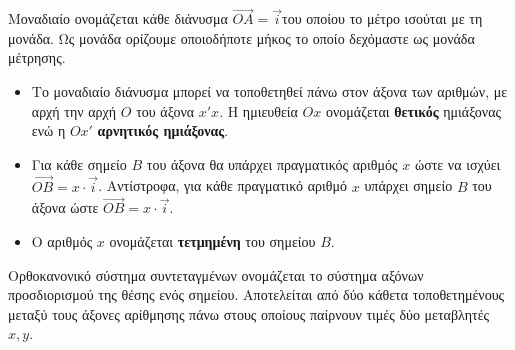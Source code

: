 \documentclass[twoside,nofonts,internet,shmeiwseis]{thewria}
\begin{document}
\orismoi
{}
Μοναδιαίο ονομάζεται κάθε διάνυσμα $ \overrightarrow{OA}=\vec{i} $του οποίου το μέτρο ισούται με τη μονάδα. Ως μονάδα ορίζουμε οποιοδήποτε μήκος το οποίο δεχόμαστε ως μονάδα μέτρησης.
\begin{center}
\end{center}
\begin{itemize}
\item Το μοναδιαίο διάνυσμα μπορεί να τοποθετηθεί πάνω στον άξονα των αριθμών, με αρχή την αρχή $ O $ του άξονα $ x'x $. Η ημιευθεία $ Ox $ ονομάζεται \textbf{θετικός} ημιάξονας ενώ η $ Ox' $ \textbf{αρνητικός ημιάξονας}.
\item Για κάθε σημείο $ B $ του άξονα θα υπάρχει πραγματικός αριθμός $ x $ ώστε να ισχύει $ \overrightarrow{OB}=x\cdot\vec{i} $. Αντίστροφα, για κάθε πραγματικό αριθμό $ x $ υπάρχει σημείο $ B $ του άξονα ώστε $ \overrightarrow{OB}=x\cdot\vec{i} $.
\item Ο αριθμός $ x $ ονομάζεται \textbf{τετμημένη} του σημείου $ B $.
\end{itemize}
Ορθοκανονικό σύστημα συντεταγμένων ονομάζεται το σύστημα αξόνων προσδιορισμού της θέσης ενός σημείου. Αποτελείται από δύο κάθετα τοποθετημένους μεταξύ τους άξονες αρίθμησης πάνω στους οποίους παίρνουν τιμές δύο μεταβλητές $ x,y $.\\
\end{document}
